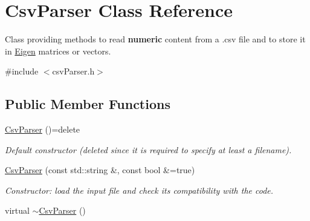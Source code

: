 \hypertarget{classCsvParser}{\section{Csv\-Parser Class Reference}
\label{classCsvParser}
}


Class providing methods to read {\bfseries numeric} content from a .csv file and to store it in \hyperlink{index_Eigen}{Eigen} matrices or vectors.  




{\ttfamily \#include $<$csv\-Parser.\-h$>$}

\subsection*{Public Member Functions}
\begin{DoxyCompactItemize}
\item 
\hypertarget{classCsvParser_a9694abc21c2bc6d593a2489f6896ca10}{\hyperlink{classCsvParser_a9694abc21c2bc6d593a2489f6896ca10}{Csv\-Parser} ()=delete}\label{classCsvParser_a9694abc21c2bc6d593a2489f6896ca10}

\begin{DoxyCompactList}\small\item\em Default constructor (deleted since it is required to specify at least a filename). \end{DoxyCompactList}\item 
\hyperlink{classCsvParser_a928811b407ea6816bab9fef75d504301}{Csv\-Parser} (const std\-::string \&, const bool \&=true)
\begin{DoxyCompactList}\small\item\em Constructor\-: load the input file and check its compatibility with the code. \end{DoxyCompactList}\item 
\hypertarget{classCsvParser_a73aa36f7e9a832f184c98873c930e83e}{virtual \hyperlink{classCsvParser_a73aa36f7e9a832f184c98873c930e83e}{$\sim$\-Csv\-Parser} ()}\label{classCsvParser_a73aa36f7e9a832f184c98873c930e83e}


\end{DoxyCompactItemize}
